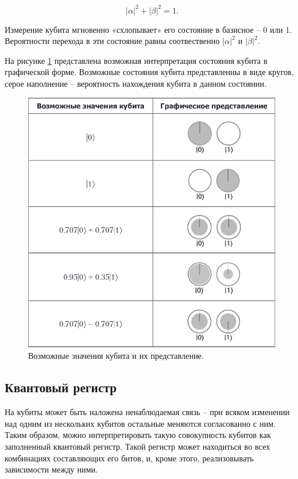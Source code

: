 \begin{equation}
\label{for:ver}
|\alpha|^2 + |\beta|^2 = 1. 
\end{equation} 

Измерение кубита мгновенно «схлопывает»  его состояние в базисное – 0 или 1. Вероятности перехода в эти состояние равны соотвественно $|\alpha|^2$ и $|\beta|^2$. 

На рисунке \ref{img:qbits_table} представлена возможная интерпретация состояния кубита в графической форме. Возможные состояния кубита представленны в виде кругов, серое наполнение -- вероятность нахождения кубита в данном состоянии.

\begin{figure}[H]
	\begin{center}
		\includegraphics[scale=0.45]{img/qbits.png}
	\end{center}
	\captionsetup{justification=centering}
	\caption{Возможные значения кубита и их представление.}
	\label{img:qbits_table}
\end{figure}

\subsection{Квантовый регистр}

На кубиты может быть наложена ненаблюдаемая связь -- при всяком изменении над одним из нескольких кубитов остальные меняются согласованно с ним. Таким образом, можно интерпретировать такую совокупность кубитов как заполненный квантовый регистр. Такой регистр может находиться во всех комбинациях составляющих его битов, и, кроме этого, реализовывать зависимости между ними.

